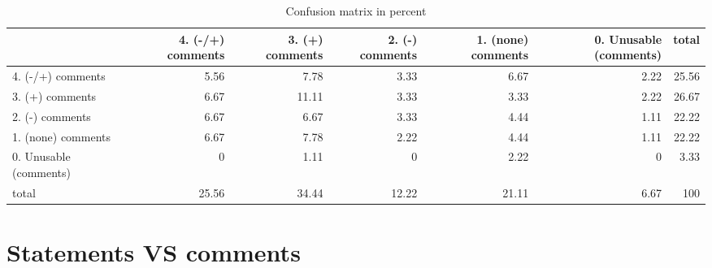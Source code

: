 \documentclass{article}
\begin{document}
\begin{table}[H]

\centering

\begin{tabular}{lrrrrrr}
\hline
                        &   4. (-/+) comments &   3. (+) comments &   2. (-) comments &   1. (none) comments &   0. Unusable (comments) &   total \\
\hline
 4. (-/+) comments      &                5.56 &              7.78 &              3.33 &                 6.67 &                     2.22 &   25.56 \\
 3. (+) comments        &                6.67 &             11.11 &              3.33 &                 3.33 &                     2.22 &   26.67 \\
 2. (-) comments        &                6.67 &              6.67 &              3.33 &                 4.44 &                     1.11 &   22.22 \\
 1. (none) comments     &                6.67 &              7.78 &              2.22 &                 4.44 &                     1.11 &   22.22 \\
 0. Unusable (comments) &                0    &              1.11 &              0    &                 2.22 &                     0    &    3.33 \\
 total                  &               25.56 &             34.44 &             12.22 &                21.11 &                     6.67 &  100    \\
\hline
\end{tabular}\caption{Confusion matrix in percent}

\end{table}



\section{Statements VS comments} 
\end{document}
